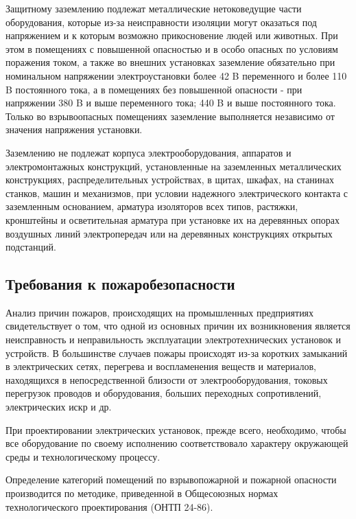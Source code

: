         Защитному заземлению подлежат металлические нетоковедущие части
        оборудования, которые из-за неисправности изоляции могут оказаться под
        напряжением и к которым возможно прикосновение людей или животных. При
        этом в помещениях с повышенной опасностью и в особо опасных по условиям
        поражения током, а также во внешних установках заземление обязательно
        при номинальном напряжении электроустановки более 42 B переменного и
        более 110 B постоянного тока, а в помещениях без повышенной опасности -
        при напряжении 380 B и выше переменного тока; 440 B и выше постоянного
        тока. Только во взрывоопасных помещениях заземление выполняется
        независимо от значения напряжения установки.

        Заземлению не подлежат корпуса электрооборудования, аппаратов и
        электромонтажных конструкций, установленные на заземленных
        металлических конструкциях, распределительных устройствах, в щитах,
        шкафах, на станинах станков, машин и механизмов, при условии надежного
        электрического контакта с заземленным основанием, арматура изоляторов
        всех типов, растяжки, кронштейны и осветительная арматура при установке
        их на деревянных опорах воздушных линий электропередач или на
        деревянных конструкциях открытых подстанций.

    \subsection{Требования к пожаробезопасности}

        Анализ причин пожаров, происходящих на промышленных предприятиях
        свидетельствует о том, что одной из основных причин их возникновения
        является неисправность и неправильность эксплуатации электротехнических
        установок и устройств. В большинстве случаев пожары происходят из-за
        коротких замыканий в электрических сетях, перегрева и воспламенения
        веществ и материалов, находящихся в непосредственной близости от
        электрооборудования, токовых перегрузок проводов и оборудования,
        больших переходных сопротивлений, электрических искр и др.

        При проектировании электрических установок, прежде всего, необходимо,
        чтобы все оборудование по своему исполнению соответствовало характеру
        окружающей среды и технологическому процессу.

        Определение категорий помещений по взрывопожарной и пожарной опасности
        производится по методике, приведенной в Общесоюзных нормах
        технологического проектирования (ОНТП 24-86).

